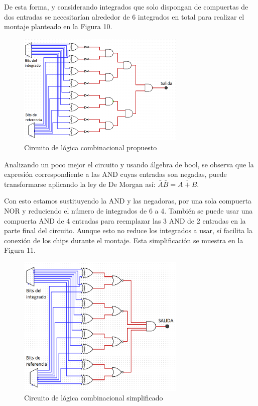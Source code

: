 \documentclass{article}
\begin{document}
De esta forma, y considerando integrados que solo dispongan de compuertas de dos entradas se necesitarían alrededor de 6 integrados en total para realizar el montaje planteado en la Figura 10.

\begin{figure}[!h] 
\includegraphics[width=8cm]{logica1.png}
\centering
\caption{Circuito de lógica combinacional propuesto}
\end{figure}

Analizando un poco mejor el circuito y usando álgebra de bool, se observa que la expresión correspondiente a las AND cuyas entradas son negadas, puede transformarse aplicando la ley de De Morgan así: $\bar{A}\bar{B} = \overline{A+B}$.

Con esto estamos sustituyendo la AND y las negadoras, por una sola compuerta NOR y reduciendo el número de integrados de 6 a 4. También se puede usar una compuerta AND de 4 entradas para reemplazar las 3 AND de 2 entradas en la parte final del circuito. Aunque esto no reduce los integrados a usar, sí facilita la conexión de los chips durante el montaje. Esta simplificación se muestra en la Figura 11.\\

\begin{figure}[!ht] 
\includegraphics[width=8cm]{logica2.png}
\centering
\caption{Circuito de lógica combinacional simplificado}
\end{figure}
\end{document}

